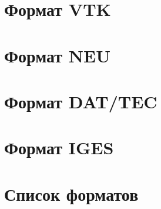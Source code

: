 \documentclass[a4paper,12pt]{article}
\begin{document}
\section{Формат VTK}
\section{Формат NEU}
\section{Формат DAT/TEC}
\section{Формат IGES}

\section{Список форматов}
\end{document}
